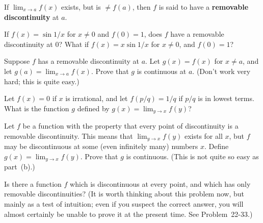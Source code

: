 If $\lim_{x \to a} f(x)$ exists, but is $\neq f(a)$, then $f$ is said to
have a \textbf{removable discontinuity} at $a$.
\begin{letters}
\item If $f(x) = \sin 1/x$ for $x \neq 0$ and $f(0) = 1$, does $f$ have
  a removable discontinuity at $0$? What if $f(x) = x \sin 1/x$ for
  $x \neq 0$, and $f(0) = 1$?
\item Suppose $f$ has a removable discontinuity at $a$. Let
  $g(x) = f(x)$ for $x \neq a$, and let $g(a) = \lim_{x \to a} f(x)$.
  Prove that $g$ is continuous at $a$. (Don't work very hard; this is
  quite easy.)
\item Let $f(x) = 0$ if $x$ is irrational, and let $f(p/q) = 1/q$ if
  $p/q$ is in lowest terms. What is the function $g$ defined by
  $g(x) = \lim_{y \to x} f(y)$?
\item[*(d)] Let $f$ be a function with the property that every point of
  discontinuity is a removable discontinuity. This means that
  $\lim_{y \to x} f(y)$ exists for all $x$, but $f$ may be discontinuous
  at some (even infinitely many) numbers $x$. Define
  $g(x) = \lim_{y \to x} f(y)$. Prove that $g$ is continuous. (This is
  not quite so easy as part~(b).)
\item[**(e)] Is there a function $f$ which is discontinuous at every
  point, and which has only removable discontinuities? (It is worth
  thinking about this problem now, but mainly as a test of intuition;
  even if you suspect the correct answer, you will almost certainly be
  unable to prove it at the present time. See Problem~22-33.)
\end{letters}
